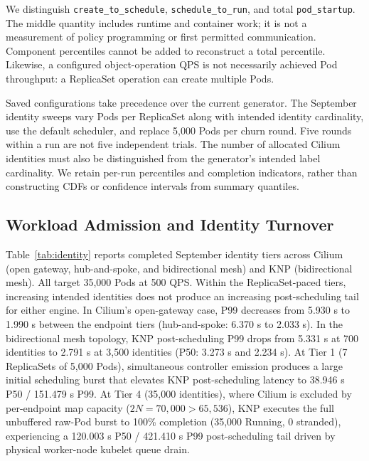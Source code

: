 \documentclass[letterpaper,twocolumn,10pt]{article}
\newcommand{\sys}{\textsc{KNP}}
\begin{document}
We distinguish \texttt{create\_to\_schedule},
\texttt{schedule\_to\_run}, and total \texttt{pod\_startup}.
The middle quantity includes runtime and container work; it is not a
measurement of policy programming or first permitted communication.
Component percentiles cannot be added to reconstruct a total percentile.
Likewise, a configured object-operation QPS is not necessarily achieved
Pod throughput: a ReplicaSet operation can create multiple Pods.

Saved configurations take precedence over the current generator. The
September identity sweeps vary Pods per ReplicaSet along with intended
identity cardinality, use the default scheduler, and replace 5,000 Pods
per churn round. Five rounds within a run are not five independent trials.
The number of allocated Cilium identities must also be distinguished
from the generator's intended label cardinality. We retain per-run
percentiles and completion indicators, rather than constructing CDFs
or confidence intervals from summary quantiles.

\subsection{Workload Admission and Identity Turnover}
Table~\ref{tab:identity} reports completed September identity tiers
across Cilium (open gateway, hub-and-spoke, and bidirectional mesh) and
\sys{} (bidirectional mesh). All target 35,000 Pods at 500 QPS.
Within the ReplicaSet-paced tiers, increasing intended identities does not
produce an increasing post-scheduling tail for either engine. In Cilium's
open-gateway case, P99 decreases from 5.930 s to 1.990 s between the
endpoint tiers (hub-and-spoke: 6.370 s to 2.033 s). In the bidirectional
mesh topology, \sys{} post-scheduling P99 drops from 5.331 s at 700
identities to 2.791 s at 3,500 identities (P50: 3.273 s and 2.234 s).
At Tier 1 (7 ReplicaSets of 5,000 Pods), simultaneous controller emission
produces a large initial scheduling burst that elevates \sys{} post-scheduling
latency to 38.946 s P50 / 151.479 s P99. At Tier 4 (35,000 identities),
where Cilium is excluded by per-endpoint map capacity ($2N=70{,}000 > 65{,}536$),
\sys{} executes the full unbuffered raw-Pod burst to 100\% completion
(35,000 Running, 0 stranded), experiencing a 120.003 s P50 / 421.410 s P99
post-scheduling tail driven by physical worker-node kubelet queue drain.
\end{document}
